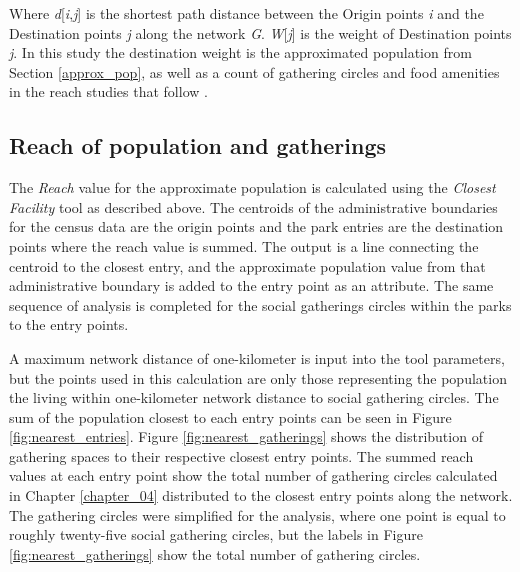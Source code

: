 \begin{multicols}{2}
Where \textit{d}[\textit{i},\textit{j}] is the shortest path distance between the Origin points \textit{i} and the Destination points \textit{j} along the network \textit{G}. \textit{W}[\textit{j}] is the weight of Destination points \textit{j}. In this study the destination weight is the approximated population from Section \ref{approx_pop}, as well as a count of gathering circles and food amenities in the reach studies that follow \cite{sevtsuk_urban_2012}. 

\subsection{Reach of population and gatherings}\label{reach}
The \textit{Reach} value for the approximate population is calculated using the \textit{Closest Facility} tool as described above. The centroids of the administrative boundaries for the census data are the origin points and the park entries are the destination points where the reach value is summed. The output is a line connecting the centroid to the closest entry, and the approximate population value from that administrative boundary is added to the entry point as an attribute. The same sequence of analysis is completed for the social gatherings circles within the parks to the entry points. 

A maximum network distance of one-kilometer is input into the tool parameters, but the points used in this calculation are only those representing the population the living within one-kilometer network distance to social gathering circles. The sum of the population closest to each entry points can be seen in Figure \ref{fig:nearest_entries}. Figure \ref{fig:nearest_gatherings} shows the distribution of gathering spaces to their respective closest entry points. The summed reach values at each entry point show the total number of gathering circles calculated in Chapter \ref{chapter_04} distributed to the closest entry points along the network. The gathering circles were simplified for the analysis, where one point is equal to roughly twenty-five social gathering circles, but the labels in Figure \ref{fig:nearest_gatherings} show the total number of gathering circles.


\end{multicols}
